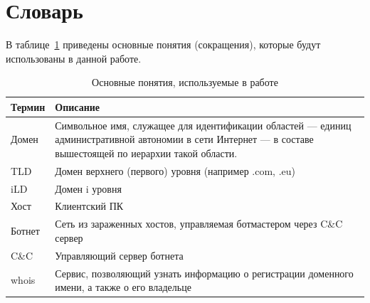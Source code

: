 \documentclass[a4paper,14pt]{extreport} %
\begin{document}
\section{Словарь}
В таблице~\ref{tab:dict} приведены основные понятия (сокращения), которые будут использованы в данной работе.
\begin{table}[H]
\caption{Основные понятия, используемые в работе}\label{tab:dict}
\begin{tabular}{|p{3cm}| p{10cm}|}
	\hline
	Термин & Описание                                                                    \\ \hline
	
	Домен   & Символьное имя, служащее для идентификации областей — единиц административной автономии в сети Интернет — в составе вышестоящей по иерархии такой области. \\ 
	TLD          & Домен верхнего (первого) уровня (например .com, .eu)                                                                                                                                                                                                           \\
	iLD          & Домен i уровня                                                                                                                                                                                                                                                                        \\
	Хост     & Клиентский ПК                                                                                                                                                                                                                                                                        \\
	Ботнет & Сеть из зараженных хостов, управляемая ботмастером через C\&C сервер                                                                                                                                                                      \\
	C\&C         & Управляющий сервер ботнета                                                                                                                                                                                                                                               \\
	whois        & Сервис, позволяющий узнать информацию о регистрации доменного имени, а также о его владельце                                                                                                                       \\

\end{tabular}
\end{table}
\end{document}

